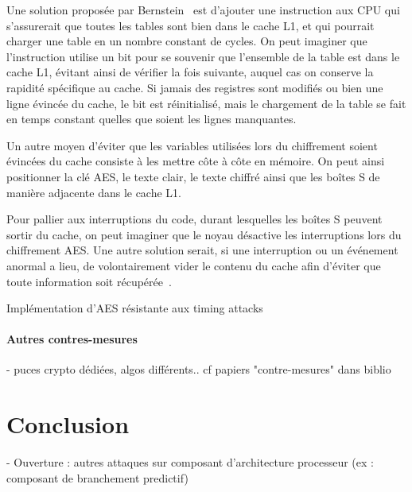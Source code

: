\documentclass[a4paper,11pt]{article}
\begin{document}
Une solution proposée par Bernstein~\cite{bernstein2005cache} est d'ajouter une instruction aux CPU qui s'assurerait que toutes les tables sont bien dans le cache L1, et qui pourrait charger une table en un nombre constant de cycles. On peut imaginer que l'instruction utilise un bit pour se souvenir que l'ensemble de la table est dans le cache L1, évitant ainsi de vérifier la fois suivante, auquel cas on conserve la rapidité spécifique au cache. Si jamais des registres sont modifiés ou bien une ligne évincée du cache, le bit est réinitialisé, mais le chargement de la table se fait en temps constant quelles que soient les lignes manquantes.

Un autre moyen d'éviter que les variables utilisées lors du chiffrement soient évincées du cache consiste à les mettre côte à côte en mémoire. On peut ainsi positionner la clé AES, le texte clair, le texte chiffré ainsi que les boîtes S de manière adjacente dans le cache L1.

Pour pallier aux interruptions du code, durant lesquelles les boîtes S peuvent sortir du cache, on peut imaginer que le noyau désactive les interruptions lors du chiffrement AES. Une autre solution serait, si une interruption ou un événement anormal a lieu, de volontairement vider le contenu du cache afin d'éviter que toute information soit récupérée~\cite{canteaut2006understanding}.



Implémentation d'AES résistante aux timing attacks~\cite{kasper2009faster} %

\paragraph{Autres contres-mesures}
- puces crypto dédiées, algos différents.. cf papiers "contre-mesures" dans biblio %



\section*{Conclusion}

- Ouverture : autres attaques sur composant d'architecture processeur (ex :
  composant de branchement predictif)

\newpage
\nocite{*}


\end{document}
